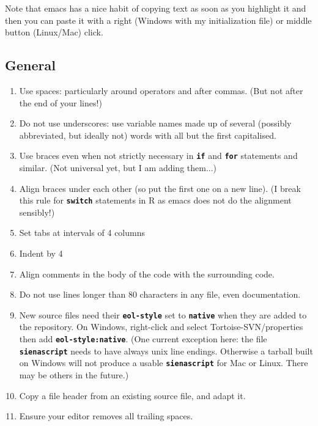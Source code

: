 \documentclass[12pt, a4paper]{article}
\renewcommand{\=}{\,=\,}
\newcommand{\+}{\,+\,}
\newcommand{\sfn}[1]{\textbf{\texttt{#1}}}
\begin{document}
Note that emacs has a nice habit of copying text as soon as you highlight it and
then you can paste it with a right (Windows with my initialization file) or
middle button (Linux/Mac) click.
\subsection{General}
\begin{enumerate}
\item Use spaces: particularly around operators and after commas. (But
  not after the end of your lines!)
\item Do not use underscores: use variable names made up of several (possibly
  abbreviated, but ideally not) words with all but the first capitalised.
\item Use braces even when not strictly necessary in \sfn{if} and \sfn{for}
  statements and similar. (Not universal yet, but I am adding them...)
\item Align braces under each other (so put the first one on a new line). (I
  break this rule for \sfn{switch} statements in R as emacs does not do the
  alignment sensibly!)
\item Set tabs at intervals of 4 columns
\item Indent by 4
\item Align comments in the body of the code with the surrounding code.
\item Do not use lines longer than 80 characters in any file, even
  documentation.
\item New source files need their \sfn{eol-style} set to \sfn{native} when they
  are added to the repository. On Windows, right-click and select
  Tortoise-SVN/properties then add \sfn{eol-style:native}.  (One current
  exception here: the file \sfn{sienascript} needs to have always unix line
  endings. Otherwise a tarball built on Windows will not produce a usable
  \sfn{sienascript} for Mac or Linux. There may be others in the future.)
\item Copy a file header from an existing source file, and adapt it.
\item Ensure your editor removes all trailing spaces.
\end{enumerate}
\end{document}
